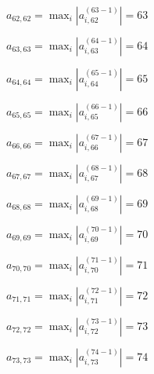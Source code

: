 \documentclass[a4paper,12pt]{article}
\begin{document}
$a _{ 62, 62 } =  \max _i |a _{ i, 62 } ^{ (63 - 1) } | = 63$

$a _{ 63, 63 } =  \max _i |a _{ i, 63 } ^{ (64 - 1) } | = 64$

$a _{ 64, 64 } =  \max _i |a _{ i, 64 } ^{ (65 - 1) } | = 65$

$a _{ 65, 65 } =  \max _i |a _{ i, 65 } ^{ (66 - 1) } | = 66$

$a _{ 66, 66 } =  \max _i |a _{ i, 66 } ^{ (67 - 1) } | = 67$

$a _{ 67, 67 } =  \max _i |a _{ i, 67 } ^{ (68 - 1) } | = 68$

$a _{ 68, 68 } =  \max _i |a _{ i, 68 } ^{ (69 - 1) } | = 69$

$a _{ 69, 69 } =  \max _i |a _{ i, 69 } ^{ (70 - 1) } | = 70$

$a _{ 70, 70 } =  \max _i |a _{ i, 70 } ^{ (71 - 1) } | = 71$

$a _{ 71, 71 } =  \max _i |a _{ i, 71 } ^{ (72 - 1) } | = 72$

$a _{ 72, 72 } =  \max _i |a _{ i, 72 } ^{ (73 - 1) } | = 73$

$a _{ 73, 73 } =  \max _i |a _{ i, 73 } ^{ (74 - 1) } | = 74$
\end{document}
